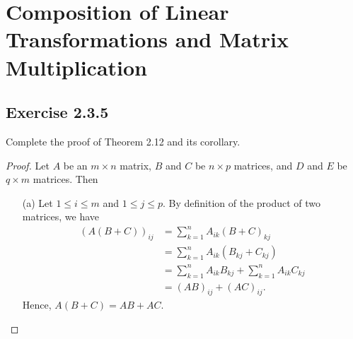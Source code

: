 \section{Composition of Linear Transformations and Matrix Multiplication}


\subsection*{Exercise 2.3.5} Complete the proof of Theorem 2.12 and its corollary. 
\begin{proof}
    Let \( A  \) be an \( m \times n  \) matrix, \( B  \) and \(  C  \) be \( n \times p  \) matrices, and \( D  \) and \( E  \) be \( q \times  m  \) matrices. Then
\begin{enumerate}
    \item[(a)] Let \( 1 \leq i \leq m  \) and \( 1 \leq j \leq p  \). By definition of the product of two matrices, we have 
        \begin{align*}
            (A(B+C))_{ij} &= \sum_{ k=1 }^{ n } {A}_{ik } {(B+C)}_{kj} \\ 
               &= \sum_{ k=1 }^{ n } {A}_{ik } ({B}_{kj} + {C}_{kj} ) \\
               &= \sum_{ k=1 }^{ n } {A}_{ik } {B}_{kj} + \sum_{ k=1 }^{ n } {A}_{ik} {C}_{kj} \\ 
               &= (AB)_{ij} + (AC)_{ij}.    
        \end{align*}
        Hence, \( A(B+C) = AB + AC  \).
        

\end{enumerate}
\end{proof}
